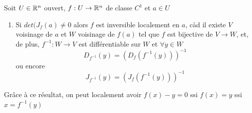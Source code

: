 \begin{theoreme}
    Soit $U \in \mathbb{R}^n$ ouvert, $f: U \to \mathbb{R}^n$ de classe $C^1$ et $a\in U$
    \begin{enumerate}
        \item Si $det(J_f(a) \ne 0$ alors $f$ est inversible localement en $a$,
        càd il existe $V$ voisinage de $a$ et $W$ voisinage de $f(a)$ tel que $f$ est bijective de $V \to W$, et, de plus, $f^{-1}: W \to V$ est différentiable sur $W$ et $\forall y \in W$
        $$ D_{f^{-1}}(y) = (D_f(f^{-1}(y)))^{-1}$$ ou encore 
        $$ J_{f^{-1}}(y) = (J_f(f^{-1}(y)))^{-1}$$
    \end{enumerate}
\end{theoreme}

Grâce à ce résultat, on peut localement avoir $f(x) - y = 0$ ssi $f(x) = y$ ssi $x = f^{-1}(y)$

